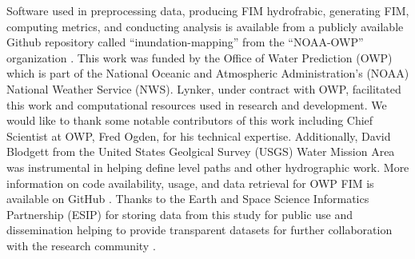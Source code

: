 \documentclass[draft]{dependencies/agujournal2019}
\begin{document}
Software used in preprocessing data, producing FIM hydrofrabic, generating FIM, computing metrics, and conducting analysis is available from a publicly available Github repository called ``inundation-mapping'' from the ``NOAA-OWP'' organization \cite{inundationMapping2022}.
\clearpage %
\acknowledgments
%
This work was funded by the Office of Water Prediction (OWP) which is part of the National Oceanic and Atmospheric Administration's (NOAA) National Weather Service (NWS).
Lynker, under contract with OWP, facilitated this work and computational resources used in research and development.
We would like to thank some notable contributors of this work including Chief Scientist at OWP, Fred Ogden, for his technical expertise.
Additionally, David Blodgett from the United States Geolgical Survey (USGS) Water Mission Area was instrumental in helping define level paths and other hydrographic work.
More information on code availability, usage, and data retrieval for OWP FIM is available on GitHub \cite{inundationMapping2022}.
Thanks to the Earth and Space Science Informatics Partnership (ESIP) for storing data from this study for public use and dissemination helping to provide transparent datasets for further collaboration with the research community \cite{esipData2022}.
\clearpage %

%



%
%
\end{document}
